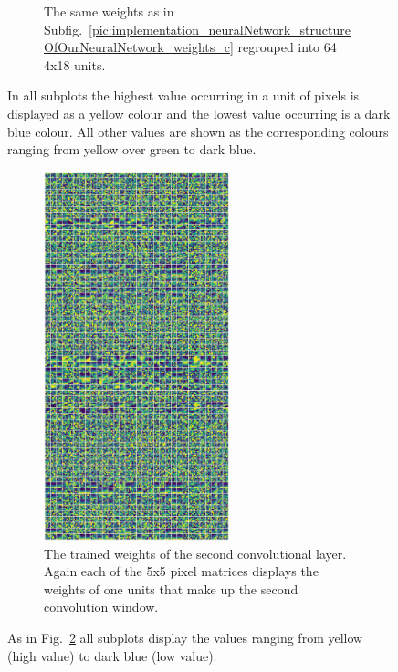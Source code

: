 \begin{figure}[h!]
\begin{subfigure}[t]{\textwidth}
		\caption{The same weights as in Subfig.~\ref{pic:implementation_neuralNetwork_structureOfOurNeuralNetwork_weights_c} regrouped into 64 4x18 units.}
		\label{pic:implementation_neuralNetwork_structureOfOurNeuralNetwork_weights_d}
	\end{subfigure}
	\caption{In all subplots the highest value occurring in a unit of pixels is displayed as a yellow colour and the lowest value occurring is a dark blue colour. All other values are shown as the corresponding colours ranging from yellow over green to dark blue.}
	\label{pic:implementation_neuralNetwork_structureOfOurNeuralNetwork_weights1}
\end{figure}

\newpage

\begin{figure}[h!]
	\centering
	\begin{subfigure}[t]{\textwidth}
		\centering
		\includegraphics[width=0.59\textwidth]{img/implementation_neuralNetwork_structureOfOurNeuralNetwork_conv2D_2.pdf}
		\caption{The trained weights of the second convolutional layer. Again each of the 5x5 pixel matrices displays the weights of one units that make up the second convolution window.}
		\label{pic:implementation_neuralNetwork_structureOfOurNeuralNetwork_weights_b}
	\end{subfigure}
	\caption{As in Fig.~\ref{pic:implementation_neuralNetwork_structureOfOurNeuralNetwork_weights1} all subplots display the values ranging from yellow (high value) to dark blue (low value).}
	\label{pic:implementation_neuralNetwork_structureOfOurNeuralNetwork_weights2}
\end{figure}

